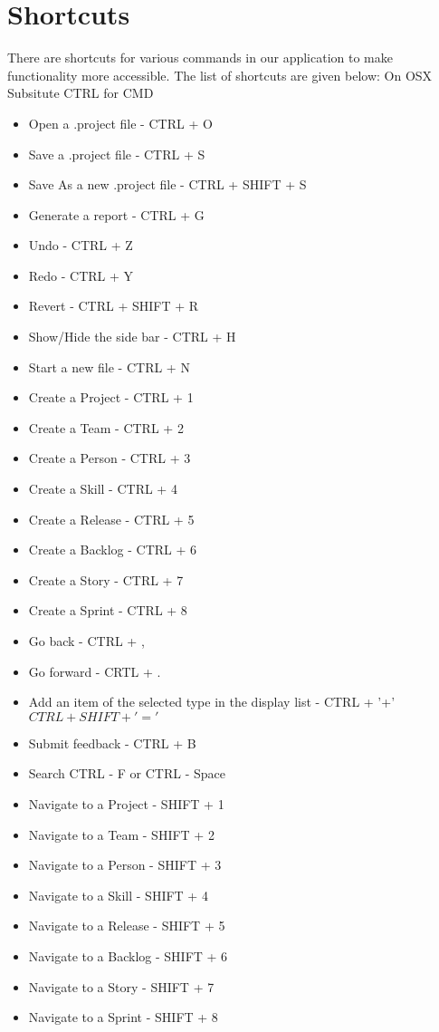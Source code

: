 \section{Shortcuts}

There are shortcuts for various commands in our application to make functionality more accessible. The list of shortcuts are given below:
On OSX Subsitute CTRL for CMD

\begin{itemize}
\item Open a .project file - CTRL + O
\item Save a .project file - CTRL + S
\item Save As a new .project file - CTRL + SHIFT + S
\item Generate a report - CTRL + G
\item Undo - CTRL + Z
\item Redo - CTRL + Y
\item Revert - CTRL + SHIFT + R
\item Show/Hide the side bar - CTRL + H
\item Start a new file - CTRL + N
\item Create a Project - CTRL + 1
\item Create a Team - CTRL + 2
\item Create a Person - CTRL + 3
\item Create a Skill - CTRL + 4
\item Create a Release - CTRL + 5
\item Create a Backlog - CTRL + 6
\item Create a Story - CTRL + 7
\item Create a Sprint - CTRL + 8
\item Go back - CTRL + ,
\item Go forward - CRTL + .
\item Add an item of the selected type in the display list - CTRL + '+' \(CTRL + SHIFT + '='\)
\item Submit feedback - CTRL + B
\item Search CTRL - F  or CTRL - Space
\item Navigate to a Project - SHIFT + 1
\item Navigate to a Team - SHIFT + 2
\item Navigate to a Person - SHIFT + 3
\item Navigate to a Skill - SHIFT + 4
\item Navigate to a Release - SHIFT + 5
\item Navigate to a Backlog - SHIFT + 6
\item Navigate to a Story - SHIFT + 7
\item Navigate to a Sprint - SHIFT + 8
\end{itemize}
